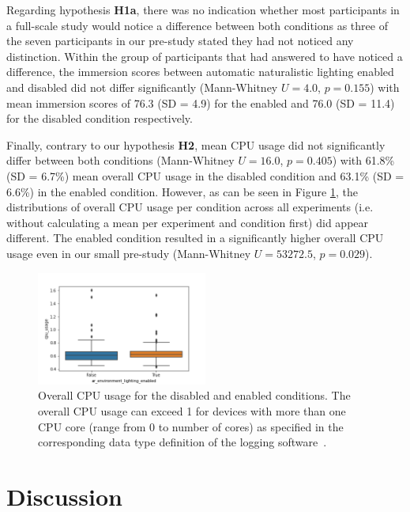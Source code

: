 \documentclass[12pt,twoside,english]{article}
\begin{document}
Regarding hypothesis \textbf{H1a}, there was no indication whether most participants in a full-scale study would notice a difference between both conditions as three of the seven participants in our pre-study stated they had not noticed any distinction.
Within the group of participants that had answered to have noticed a difference, the immersion scores between automatic naturalistic lighting enabled and disabled did not differ significantly (Mann-Whitney $ U = 4.0 $, $ p = 0.155 $) with mean immersion scores of 76.3 (SD = 4.9) for the enabled and 76.0 (SD = 11.4) for the disabled condition respectively.

Finally, contrary to our hypothesis \textbf{H2}, mean \gls{CPU} usage did not significantly differ between both conditions (Mann-Whitney $ U = 16.0 $, $ p = 0.405 $) with 61.8\% (SD = 6.7\%) mean overall \gls{CPU} usage in the disabled condition and 63.1\% (SD = 6.6\%) in the enabled condition.
However, as can be seen in Figure \ref{fig:cpu_raw_plot}, the distributions of overall \gls{CPU} usage per condition across all experiments (i.e. without calculating a mean per experiment and condition first) did appear different.
The enabled condition resulted in a significantly higher overall \gls{CPU} usage even in our small pre-study (Mann-Whitney $ U = 53272.5 $, $ p = 0.029 $).

\begin{figure}[h]
    \centering
    \includegraphics[width=0.5\textwidth]{imgs/cpu_raw_plot}
    \caption{Overall \gls{CPU} usage for the disabled and enabled conditions. The overall \gls{CPU} usage can exceed 1 for devices with more than one \gls{CPU} core (range from 0 to number of cores) as specified in the corresponding data type definition of the logging software~\cite{apple_system_2020}.}
    \label{fig:cpu_raw_plot}
\end{figure}


\section{Discussion}
\label{sect:discussion}
\end{document}
